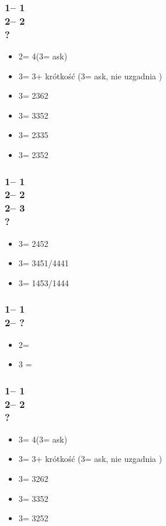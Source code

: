 \documentclass[12pt, a4paper]{report}
\begin{document}
{    \subsubsection*{1\diams -- 1\hearts\\
                    2\hearts -- 2\spades\\
                    ?}
    \begin{itemize}
        \item 2\nt = 4\hearts (3\clubs = ask)
        \item 3\clubs = 3\hearts + krótkość (3\diams = ask, nie uzgadnia \hearts)
        \item 3\diams = 2362
        \item 3\hearts = 3352
        \item 3\spades = 2335
        \item 3\nt = 2352
    \end{itemize}

    \subsubsection*{1\diams -- 1\hearts\\
                    2\hearts -- 2\spades\\
                    2\nt -- 3\clubs\\
                    ?}
    \begin{itemize}
        \item 3\diams = 2452
        \item 3\hearts = 3451/4441
        \item 3\spades = 1453/1444
    \end{itemize}

    \subsubsection*{1\diams -- 1\spades\\
                    2\spades -- ?}
    \begin{itemize}
        \item 2\nt = \gf
        \item 3 = \inv
    \end{itemize}

    \subsubsection*{1\diams -- 1\spades\\
                    2\spades -- 2\nt\\
                    ?}
    \begin{itemize}
        \item 3\clubs = 4\spades (3\diams = ask)
        \item 3\diams = 3\spades + krótkość (3\hearts = ask, nie uzgadnia \spades)
        \item 3\hearts = 3262
        \item 3\spades = 3352
        \item 3\nt = 3252
    \end{itemize}

}
\end{document}

